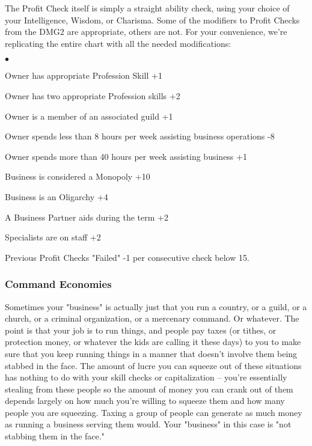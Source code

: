 The Profit Check itself is simply a straight ability check, using your choice of your Intelligence, Wisdom, or Charisma. Some of the modifiers to Profit Checks from the DMG2 are appropriate, others are not. For your convenience, we're replicating the entire chart with all the needed modifications:

\begin{list}{$\bullet$}{\itemspace}
    \item Owner has appropriate Profession Skill +1
    \item Owner has two appropriate Profession skills +2
    \item Owner is a member of an associated guild +1
    \item Owner spends less than 8 hours per week assisting business operations -8
    \item Owner spends more than 40 hours per week assisting business +1
    \item Business is considered a Monopoly +10
    \item Business is an Oligarchy +4
    \item A Business Partner aids during the term +2
    \item Specialists are on staff +2
    \item Previous Profit Checks "Failed" -1 per consecutive check below 15.
\end{list}


\subsubsection{Command Economies}

Sometimes your "business" is actually just that you run a country, or a guild, or a church, or a criminal organization, or a mercenary command. Or whatever. The point is that your job is to run things, and people pay taxes (or tithes, or protection money, or whatever the kids are calling it these days) to you to make sure that you keep running things in a manner that doesn't involve them being stabbed in the face. The amount of lucre you can squeeze out of these situations has nothing to do with your skill checks or capitalization -- you're essentially stealing from these people so the amount of money you can crank out of them depends largely on how much you're willing to squeeze them and how many people you are squeezing. Taxing a group of people can generate as much money as running a business serving them would. Your "business" in this case is "not stabbing them in the face."


